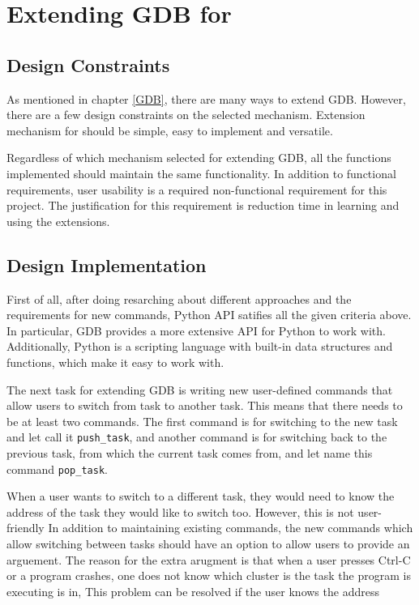\chapter{Extending GDB for \uCPP}

\section{Design Constraints}
As mentioned in chapter \ref{GDB}, there are many ways to extend GDB. However,
there are a few design constraints on the selected mechanism. Extension
mechanism for \uCPPS should be simple, easy to implement and versatile.

Regardless of which mechanism selected for extending GDB, all the functions
implemented should maintain the same functionality. In addition to functional
requirements, user usability is a required non-functional requirement for this
project. The justification for this requirement is reduction time in
learning and using the extensions.

\section{Design Implementation}
First of all, after doing resarching about different approaches and the requirements for new
commands, Python API satifies all the given criteria above. In particular, GDB provides a more extensive API for Python to work with. Additionally, Python
is a scripting language with built-in data structures and functions, which make
it easy to work with.

The next task for extending GDB is writing new user-defined commands that allow
users to switch from task to another task. This means that there needs to be at
least two commands. The first command is for switching to the new task and let
call it \verb|push_task|, and another command
is for switching back to the previous task, from which the current task comes
from, and let name this command \verb|pop_task|.

When a user wants to switch to a different task, they would need to know the
address of the task they would like to switch too. However, this is not
user-friendly
In addition to maintaining existing commands, the new commands which allow
switching between tasks should have an option to allow users to provide an
arguement.
The reason for the extra arugment is that when a user presses Ctrl-C
or a program crashes, one does not know which cluster is the task the program is
executing is in,
This problem can be resolved if the user knows the address
